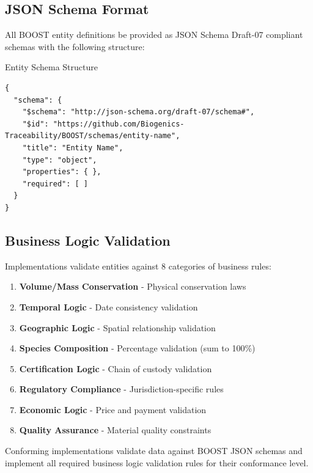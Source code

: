 
\subsection{JSON Schema Format}
\label{sec:json-schema-format}

All BOOST entity definitions \MUST{} be provided as JSON Schema Draft-07 compliant schemas with the following \REQUIRED{} structure:

\begin{jsonexample}{Entity Schema Structure}
\begin{verbatim}
{
  "schema": {
    "$schema": "http://json-schema.org/draft-07/schema#",
    "$id": "https://github.com/Biogenics-Traceability/BOOST/schemas/entity-name",
    "title": "Entity Name",
    "type": "object",
    "properties": { },
    "required": [ ]
  }
}
\end{verbatim}
\end{jsonexample}

\subsection{Business Logic Validation}
\label{sec:business-logic}

Implementations \MUST{} validate entities against 8 categories of business rules:

\begin{enumerate}
    \item \textbf{Volume/Mass Conservation} - Physical conservation laws
    \item \textbf{Temporal Logic} - Date consistency validation
    \item \textbf{Geographic Logic} - Spatial relationship validation
    \item \textbf{Species Composition} - Percentage validation (sum to 100\%)
    \item \textbf{Certification Logic} - Chain of custody validation
    \item \textbf{Regulatory Compliance} - Jurisdiction-specific rules
    \item \textbf{Economic Logic} - Price and payment validation
    \item \textbf{Quality Assurance} - Material quality constraints
\end{enumerate}

\begin{normative}[title=Validation Requirements]
Conforming implementations \MUST{} validate data against BOOST JSON schemas and implement all required business logic validation rules for their conformance level.
\end{normative}